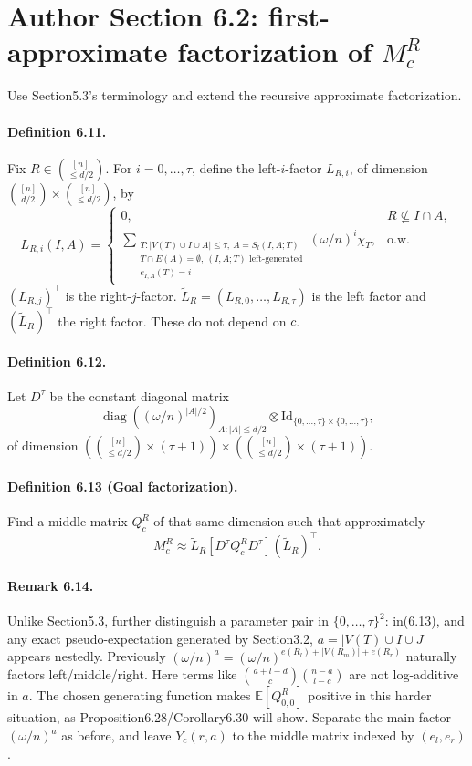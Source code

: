 \section*{Author Section 6.2: first-approximate factorization of $M_c^R$}
Use Section5.3's terminology and extend the recursive approximate factorization.
\paragraph{Definition 6.11.} Fix $R\in\binom{[n]}{\le d/2}$. For $i=0,\ldots,\tau$, define the left-$i$-factor $L_{R,i}$, of dimension $\binom{[n]}{d/2}\times\binom{[n]}{\le d/2}$, by
\[L_{R,i}(I,A)=\begin{cases}0,&R\not\subseteq I\cap A,\\\displaystyle\sum_{\substack{T:|V(T)\cup I\cup A|\le\tau,\ A=S_l(I,A;T)\\T\cap E(A)=\emptyset,\ (I,A;T)\text{ left-generated}\\e_{I,A}(T)=i}}(\omega/n)^i\chi_T,&\text{o.w.}\end{cases}\tag{6.20}\]
$(L_{R,j})^\top$ is the right-$j$-factor. $\widetilde L_R=(L_{R,0},\ldots,L_{R,\tau})$ is the left factor and $(\widetilde L_R)^\top$ the right factor. These do not depend on $c$.
\paragraph{Definition 6.12.} Let $D^\tau$ be the constant diagonal matrix
\[\operatorname{diag}((\omega/n)^{|A|/2})_{A:|A|\le d/2}\otimes\mathrm{Id}_{\{0,\ldots,\tau\}\times\{0,\ldots,\tau\}},\]
of dimension $(\binom{[n]}{\le d/2}\times(\tau+1))\times(\binom{[n]}{\le d/2}\times(\tau+1))$.
\paragraph{Definition 6.13 (Goal factorization).} Find a middle matrix $Q_c^R$ of that same dimension such that approximately
\[M_c^R\approx\widetilde L_R[D^\tau Q_c^R D^\tau](\widetilde L_R)^\top.\tag{6.21}\]
\paragraph{Remark 6.14.} Unlike Section5.3, further distinguish a parameter pair in $\{0,\ldots,\tau\}^2$: in(6.13), and any exact pseudo-expectation generated by Section3.2, $a=|V(T)\cup I\cup J|$ appears nestedly. Previously $(\omega/n)^a=(\omega/n)^{e(R_l)+|V(R_m)|+e(R_r)}$ naturally factors left/middle/right. Here terms like $\binom{a+l-d}c\binom{n-a}{l-c}$ are not log-additive in $a$. The chosen generating function makes $\mathbb E[Q_{0,0}^R]$ positive in this harder situation, as Proposition6.28/Corollary6.30 will show. Separate the main factor $(\omega/n)^a$ as before, and leave $Y_c(r,a)$ to the middle matrix indexed by $(e_l,e_r)$.
